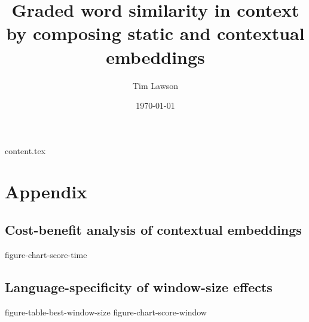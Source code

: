 \documentclass[11pt]{extarticle}
\begin{document}
\title{Graded word similarity in context by composing static and contextual embeddings}
\author{Tim Lawson}
\date{\today}

\maketitle

{content.tex}

\printbibliography

\section{Appendix}

\subsection{Cost-benefit analysis of contextual embeddings}

{figure-chart-score-time}

\subsection{Language-specificity of window-size effects}
\label{appendix:window-size}

{figure-table-best-window-size}
{figure-chart-score-window}
\end{document}

